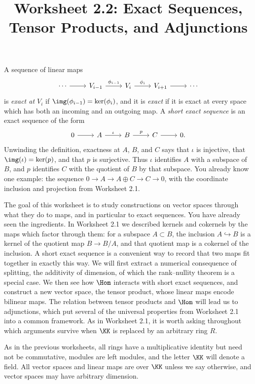 \documentclass[12pt,reqno]{amsart}
\title{Worksheet 2.2: Exact Sequences, Tensor Products, and Adjunctions}
\begin{document}
\maketitle
\thispagestyle{firstpage}

A sequence of linear maps
\[
\begin{tikzcd}
\cdots \arrow[r] & V_{i-1} \arrow[r,"\phi_{i-1}"] & V_i \arrow[r,"\phi_i"] & V_{i+1} \arrow[r] & \cdots
\end{tikzcd}
\]
is \emph{exact at $V_i$} if $\img(\phi_{i-1})=\ker(\phi_i)$, and it is \emph{exact} if it is exact at every space which has both an incoming and an outgoing map. A \emph{short exact sequence} is an exact sequence of the form
\[
\begin{tikzcd}
0 \arrow[r] & A \arrow[r,"\iota"] & B \arrow[r,"p"] & C \arrow[r] & 0.
\end{tikzcd}
\]
Unwinding the definition, exactness at $A$, $B$, and $C$ says that $\iota$ is injective, that $\img(\iota)=\ker(p)$, and that $p$ is surjective. Thus $\iota$ identifies $A$ with a subspace of $B$, and $p$ identifies $C$ with the quotient of $B$ by that subspace. You already know one example: the sequence $0\to A\to A\oplus C\to C\to0$, with the coordinate inclusion and projection from Worksheet 2.1.

The goal of this worksheet is to study constructions on vector spaces through what they do to maps, and in particular to exact sequences. You have already seen the ingredients. In Worksheet 2.1 we described kernels and cokernels by the maps which factor through them: for a subspace $A\subset B$, the inclusion $A\hookrightarrow B$ is a kernel of the quotient map $B\to B/A$, and that quotient map is a cokernel of the inclusion. A short exact sequence is a convenient way to record that two maps fit together in exactly this way. We will first extract a numerical consequence of splitting, the additivity of dimension, of which the rank--nullity theorem is a special case. We then see how $\Hom$ interacts with short exact sequences, and construct a new vector space, the tensor product, whose linear maps encode bilinear maps. The relation between tensor products and $\Hom$ will lead us to adjunctions, which put several of the universal properties from Worksheet 2.1 into a common framework. As in Worksheet 2.1, it is worth asking throughout which arguments survive when $\KK$ is replaced by an arbitrary ring $R$.

As in the previous worksheets, all rings have a multiplicative identity but need not be commutative, modules are left modules, and the letter $\KK$ will denote a field. All vector spaces and linear maps are over $\KK$ unless we say otherwise, and vector spaces may have arbitrary dimension.
\end{document}
